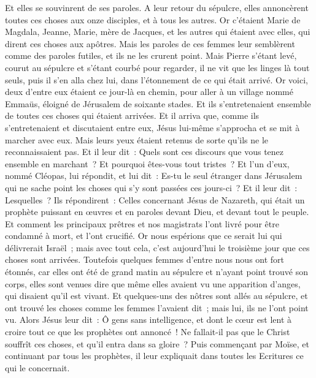 \begin{multicols}{2}
Et elles se souvinrent de ses paroles.
A leur retour du sépulcre, elles annoncèrent toutes ces choses aux onze disciples, et à tous les autres.
Or c'étaient Marie de Magdala, Jeanne, Marie, mère de Jacques, et les autres qui étaient avec elles, qui dirent ces choses aux apôtres.
Mais les paroles de ces femmes leur semblèrent comme des paroles futiles, et ils ne les crurent point.
Mais Pierre s'étant levé, courut au sépulcre et s'étant courbé pour regarder, il ne vit que les linges là tout seuls, puis il s'en alla chez lui, dans l'étonnement de ce qui était arrivé.
Or voici, deux d'entre eux étaient ce jour-là en chemin, pour aller à un village nommé Emmaüs, éloigné de Jérusalem de soixante stades.
Et ils s'entretenaient ensemble de toutes ces choses qui étaient arrivées.
Et il arriva que, comme ils s'entretenaient et discutaient entre eux, Jésus lui-même s'approcha et se mit à marcher avec eux.
Mais leurs yeux étaient retenus de sorte qu'ils ne le reconnaissaient pas.
Et il leur dit~: Quels sont ces discours que vous tenez ensemble en marchant~? Et pourquoi êtes-vous tout tristes~?
Et l'un d'eux, nommé Cléopas, lui répondit, et lui dit~: Es-tu le seul étranger dans Jérusalem qui ne sache point les choses qui s'y sont passées ces jours-ci~?
Et il leur dit~: Lesquelles~? Ils répondirent~: Celles concernant Jésus de Nazareth, qui était un prophète puissant en œuvres et en paroles devant Dieu, et devant tout le peuple.
Et comment les principaux prêtres et nos magistrats l'ont livré pour être condamné à mort, et l'ont crucifié.
Or nous espérions que ce serait lui qui délivrerait Israël~; mais avec tout cela, c'est aujourd'hui le troisième jour que ces choses sont arrivées.
Toutefois quelques femmes d'entre nous nous ont fort étonnés, car elles ont été de grand matin au sépulcre
et n'ayant point trouvé son corps, elles sont venues dire que même elles avaient vu une apparition d'anges, qui disaient qu'il est vivant.
Et quelques-uns des nôtres sont allés au sépulcre, et ont trouvé les choses comme les femmes l'avaient dit~; mais lui, ils ne l'ont point vu.
Alors Jésus leur dit~: Ô gens sans intelligence, et dont le cœur est lent à croire tout ce que les prophètes ont annoncé~!
Ne fallait-il pas que le Christ souffrît ces choses, et qu'il entra dans sa gloire~?
Puis commençant par Moïse, et continuant par tous les prophètes, il leur expliquait dans toutes les Ecritures ce qui le concernait.

\end{multicols}
